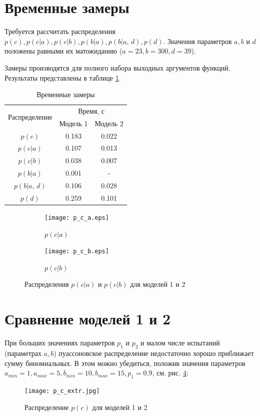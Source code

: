 \documentclass[12pt,a4paper,oneside,fleqn,leqno]{article}
\begin{document}
		\section{Временные замеры}
			Требуется рассчитать распределения $p(c), p(c|a), p(c|b), p(b|a), p(b|a,\,d), p(d)$. Значения параметров $a, b$ и $d$ положены равными их матожиданию ($a = 23, b = 300, d = 39$).\par
			Замеры производятся для полного набора выходных аргументов функций. Результаты представлены в таблице \ref{tab:time_results}.
			\begin{table}[H]
				\centering
				\begin{tabular}{|c|c|c|}
					\hline
					\multirow{2}{*}{Распределение} & \multicolumn{2}{|c|}{Время, с}\\
					\cline{2-3}
					& Модель 1 & Модель 2\\
					\hline
					$p(c)$ & 0.183 & 0.022\\
					\hline
					$p(c|a)$ & 0.107 & 0.013\\
					\hline
					$p(c|b)$ & 0.038 & 0.007\\
					\hline
					$p(b|a)$ & 0.001 & -\\
					\hline
					$p(b|a,\,d)$ & 0.106 & 0.028\\
					\hline
					$p(d)$ & 0.259 & 0.101\\
					\hline
				\end{tabular}
				\caption{Временные замеры}
				\label{tab:time_results}
			\end{table}\par
			\begin{figure}[H]
				\begin{subfigure}[b]{0.5\textwidth}
					\centering
					\texttt{[image: p\_c\_a.eps]}
					\caption{$p(c|a)$}
					\label{fig:distr_c_a}
				\end{subfigure}
				\begin{subfigure}[b]{0.5\textwidth}
					\centering
					\texttt{[image: p\_c\_b.eps]}
					\caption{$p(c|b)$}
					\label{fig:distr_c_b}
				\end{subfigure}
				\captionsetup{justification=centering}
				\caption{Распределения $p(c|a)$ и $p(c|b)$ для моделей 1 и 2}
				\label{fig:distr_c_cond}
			\end{figure}
	\section{Сравнение моделей 1 и 2}
		При больших значениях параметров $p_1$ и $p_2$ и малом числе испытаний (параметрах $a, b$) пуассоновское распределение недостаточно хорошо приближает сумму биномиальных. В этом можно убедиться, положив значения параметров $a_{min} = 1, a_{max} = 5, b_{min} = 10, b_{max} = 15, p_1 = 0.9$, см. рис. \ref{fig:distr_c_extr}:
			\begin{figure}[H]
				\captionsetup{justification=centering}
				\texttt{[image: p\_c\_extr.jpg]}
				\caption{Распределение $p(c)$ для моделей 1 и 2}
				\label{fig:distr_c_extr}
			\end{figure}\par
\end{document}
